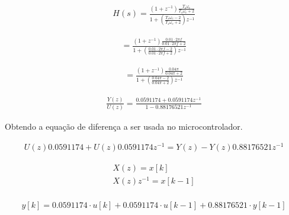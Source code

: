 \begin{equation}
    \begin{split}
        H\left( s \right) = \frac{\left(1 + z^{-1} \right) \frac{T_s\omega_c}{T_s\omega_c + 2}  }
        { 1 + \left( \frac{T_s\omega_c - 2}{T_s\omega_c + 2} \right) z^{-1} }
    \end{split}
\end{equation}


\begin{equation*}
    \begin{split}
        = \frac{\left(1 + z^{-1} \right) \frac{0.01 \cdot 2 \pi f }{0.01 \cdot 2 \pi f + 2}  }
        { 1 + \left( \frac{0.01 \cdot 2 \pi f - 2}{0.01 \cdot 2 \pi f + 2} \right) z^{-1} }
    \end{split}
\end{equation*}

\begin{equation*}
    \begin{split}
        = \frac{\left(1 + z^{-1} \right) \frac{0.04 \pi}{0.04 \pi + 2}  }
        { 1 + \left( \frac{0.04 \pi - 2}{0.04 \pi + 2} \right) z^{-1} }
    \end{split}
\end{equation*}

\begin{equation}
    \begin{split}
        \frac{Y \left( z \right)}{ U \left( z \right)} = \frac{ 0.0591174 + 0.0591174 z^{-1} }
        { 1 - 0.88176521 z^{-1} }
    \end{split}
\end{equation} 

Obtendo a equação de diferença a ser usada no microcontrolador.

\begin{equation*}
    \begin{split}
        U \left( z \right) 0.0591174 +  U \left( z \right) 0.0591174 z^{-1}
        =  Y \left( z \right) - Y \left( z \right) 0.88176521 z^{-1}
    \end{split}
\end{equation*} 

\begin{equation}
        \begin{split}
            X \left( z \right) = x[k] \\
            X \left( z \right) z^{-1} = x[k - 1] \\
        \end{split}
\end{equation}


\begin{equation}
    \begin{split}
        y[k] = 0.0591174 \cdot u \left[ k \right] +  0.0591174 \cdot u[k - 1] + 0.88176521 \cdot y[k - 1]
    \end{split}
\end{equation}